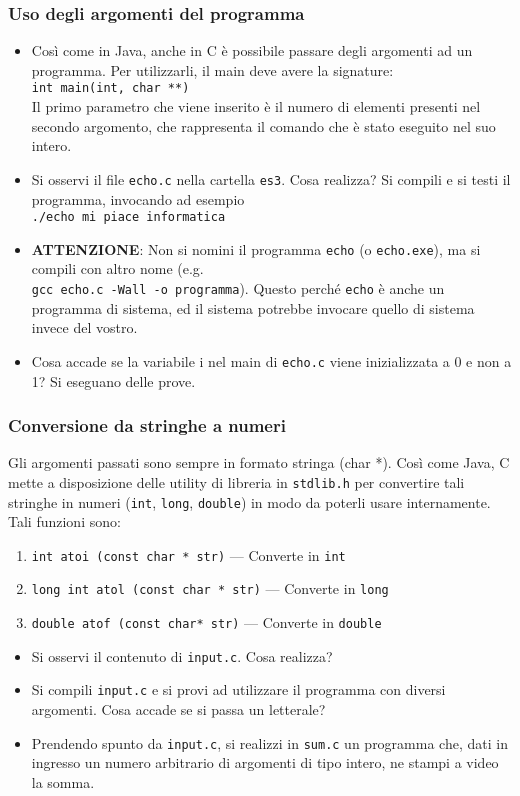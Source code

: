 \documentclass{beamer}
\begin{document}
\begin{frame}[fragile]
\frametitle{Uso degli argomenti del programma}
\begin{itemize}
 \item Così come in Java, anche in C è possibile passare degli argomenti ad un programma. Per utilizzarli, il main deve avere la signature: \\ \texttt{int main(int, char **)}\\ Il primo parametro che viene inserito è il numero di elementi presenti nel secondo argomento, che rappresenta il comando che è stato eseguito nel suo intero.
 \item Si osservi il file \texttt{echo.c} nella cartella \texttt{es3}. Cosa realizza? Si compili e si testi il programma, invocando ad esempio \\\texttt{./echo mi piace informatica}
 \item \textbf{ATTENZIONE}: Non si nomini il programma \texttt{echo} (o \texttt{echo.exe}), ma si compili con altro nome (e.g. \\ \texttt{gcc echo.c -Wall -o programma}). Questo perché \texttt{echo} è anche un programma di sistema, ed il sistema potrebbe invocare quello di sistema invece del vostro.
 \item Cosa accade se la variabile i nel main di \texttt{echo.c} viene inizializzata a 0 e non a 1? Si eseguano delle prove.
\end{itemize}
\end{frame}

\begin{frame}[fragile]
\frametitle{Conversione da stringhe a numeri}
Gli argomenti passati sono sempre in formato stringa (char *). Così come Java, C mette a disposizione delle utility di libreria in \texttt{stdlib.h} per convertire tali stringhe in numeri (\texttt{int}, \texttt{long}, \texttt{double}) in modo da poterli usare internamente. Tali funzioni sono:
\begin{enumerate}
 \item \texttt{int atoi (const char * str)} --- Converte in \texttt{int}
 \item \texttt{long int atol (const char * str)} --- Converte in \texttt{long}
 \item \texttt{double atof (const char* str)} --- Converte in \texttt{double}
\end{enumerate}
\begin{itemize}
 \item Si osservi il contenuto di \texttt{input.c}. Cosa realizza?
 \item Si compili \texttt{input.c} e si provi ad utilizzare il programma con diversi argomenti. Cosa accade se si passa un letterale?
 \item Prendendo spunto da \texttt{input.c}, si realizzi in \texttt{sum.c} un programma che, dati in ingresso un numero arbitrario di argomenti di tipo intero, ne stampi a video la somma.
\end{itemize}
\end{frame}
\end{document}
